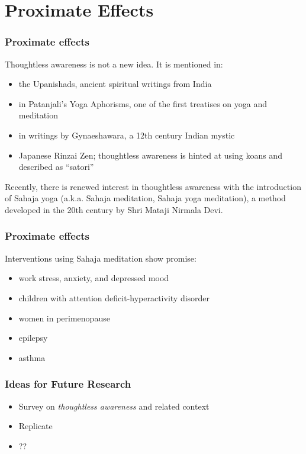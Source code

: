 \documentclass[10pt,utf8x]{beamer}
\begin{document}
\section{Proximate Effects}
\begin{frame}
\frametitle{Proximate effects}

Thoughtless awareness is not a new idea. It is mentioned in:
\begin{itemize}
\item the Upanishads, ancient spiritual writings from India
\item in Patanjali's Yoga Aphorisms, one of the first treatises on yoga and meditation
\item in writings by Gynaeshawara, a 12th century Indian mystic
\item Japanese Rinzai Zen; thoughtless awareness is hinted at using
 koans and described as ``satori''
\end{itemize}

Recently, there is renewed interest in thoughtless awareness
with the introduction of Sahaja yoga (a.k.a. Sahaja
meditation, Sahaja yoga meditation), a method developed
in the 20th century by Shri Mataji Nirmala Devi.
\end{frame}

\begin{frame}
\frametitle{Proximate effects}

Interventions using Sahaja meditation show promise:
\begin{itemize}
\item work stress, anxiety, and depressed mood \cite{manocha2011}
\item children with attention deficit-hyperactivity disorder \cite{harrison2004}
\item women in perimenopause \cite{manocha2007}
\item epilepsy \cite{panjwani2000}
\item asthma \cite{manocha2002}
\end{itemize}

\end{frame}


\begin{frame}
  \frametitle{Ideas for Future Research}
\begin{itemize}
\item Survey on \emph{thoughtless awareness} and related context
\item Replicate 
\item ??
\end{itemize}

\end{frame}

 

\end{document}
